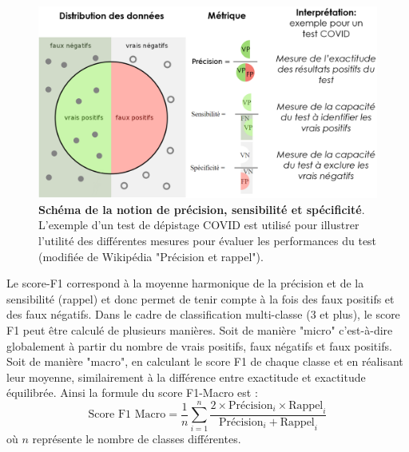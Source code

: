 \begin{figure}[!htbp]
 \centering
 \includegraphics[width=1\textwidth]{figures/prec_recall.png}
 \caption[Précision, sensibilité et spécificité]{\textbf{Schéma de la notion de précision, sensibilité et spécificité}. L'exemple d'un test de dépistage COVID est utilisé pour illustrer l'utilité des différentes mesures pour évaluer les performances du test (modifiée de Wikipédia "Précision et rappel").}
 \label{fig:prec_recall_spec}
\end{figure}

Le score-F1 correspond à la moyenne harmonique de la précision et de la sensibilité (rappel) et donc permet de tenir compte à la fois des faux positifs et des faux négatifs. Dans le cadre de classification multi-classe (3 et plus), le score F1 peut être calculé de plusieurs manières. Soit de manière "micro" c'est-à-dire globalement à partir du nombre de vrais positifs, faux négatifs et faux positifs. Soit de manière "macro", en calculant le score F1 de chaque classe et en réalisant leur moyenne, similairement à la différence entre exactitude et exactitude équilibrée. Ainsi la formule du score F1-Macro est :
\[ \text{Score F1 Macro} = \frac{1}{n} \sum_{i=1}^{n} \frac{2 \times \text{Précision}_i \times \text{Rappel}_i}{\text{Précision}_i + \text{Rappel}_i} \] où \(n\) représente le nombre de classes différentes.

